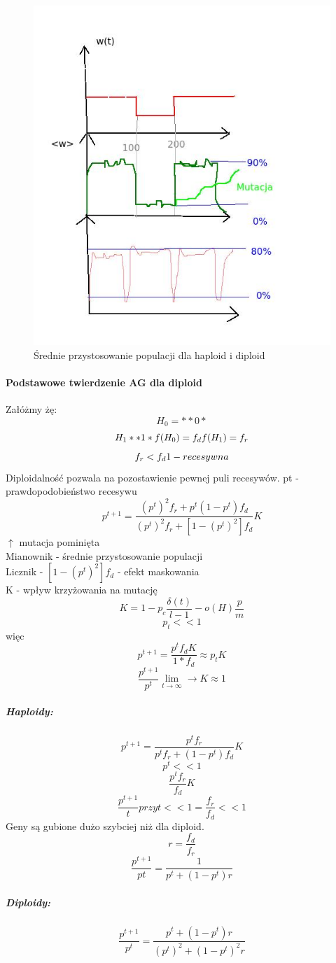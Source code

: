 \documentclass{article}
\begin{document}
				\begin{figure}[ht]
					\label{fig:fig2}
					\centering
					\includegraphics[scale=0.5]{diplohaplo.jpeg}
					\caption{Średnie przystosowanie populacji dla haploid i diploid}
				\end{figure}
				
		\paragraph{Podstawowe twierdzenie AG dla diploid} Załóżmy żę: $$H_0=**0*$$
		$$H_1 **1* \\ f(H_0) = f_d \\ f(H_1)=f_r$$
		$$f_r < f_d \\ 1 - recesywna$$
		Diploidalność pozwala na pozostawienie pewnej puli recesywów.
		pt - prawdopodobieństwo recesywu\\
		$$p^{t+1}=\frac{(p^t)^2f_r+p^t(1-p^t)f_d}{(p^t)^2f_r+[1-(p^t)^2]f_d} K$$
		$\uparrow$ mutacja pominięta \\
		Mianownik - średnie przystosowanie populacji\\
		Licznik - $[1-(p^t)^2]f_d$ - efekt maskowania \\
		K - wpływ krzyżowania na mutację  $$K = 1 - p_c\frac{\delta(t)}{l-1}- o(H)\frac{p}{m}$$
		$$p_t << 1$$ więc
		$$p^{t+1}=\frac{p^tf_dK}{1* f_d} \approx p_tK$$
		$$\frac{p^{t+1}}{p^t}\lim\limits_{t\rightarrow \infty} \rightarrow K\approx 1$$
		\subparagraph{Haploidy:}
		$$p^{t+1} = \frac{p^tf_r}{p^tf_r + (1-p^t)f_d}K$$
		$$p^t<<1$$
		$$\frac{p^tf_r}{f_d}K$$
		$$\frac{p^{t+1}}{t} przy t << 1 = \frac{f_r}{f_d} << 1$$
		Geny są gubione dużo szybciej niż dla diploid.
		$$r=\frac{f_d}{f_r}$$
		$$\frac{p^{t+1}}{pt}= \frac{1}{p^t + (1-p^t)r}$$
		\subparagraph{Diploidy:}
		$$\frac{p^{t+1}}{p^t}=\frac{p^t + (1 -p^t)r }{(p^t)^2 + (1-p^t)^2r}$$
		
\end{document}
